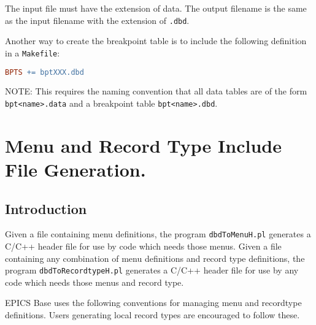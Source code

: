 The input file must have the extension of data.
The output filename is the same as the input filename with the extension of \verb|.dbd|.

Another way to create the breakpoint table is to include the following definition in a \verb|Makefile|:

\begin{lstlisting}[language=make]
BPTS += bptXXX.dbd
\end{lstlisting}

NOTE: This requires the naming convention that all data tables are of the form \verb|bpt<name>.data| and a breakpoint table \verb|bpt<name>.dbd|.

\section{Menu and Record Type Include File Generation.}

\subsection{Introduction}

Given a file containing menu definitions, the program \verb|dbdToMenuH.pl| generates a C/C++ header file for use by code which needs those menus.
Given a file containing any combination of menu definitions and record type definitions, the program \verb|dbdToRecordtypeH.pl| generates a C/C++ header file for use by any code which needs those menus and record type.

EPICS Base uses the following conventions for managing menu and recordtype definitions.
Users generating local record types are encouraged to follow these.

